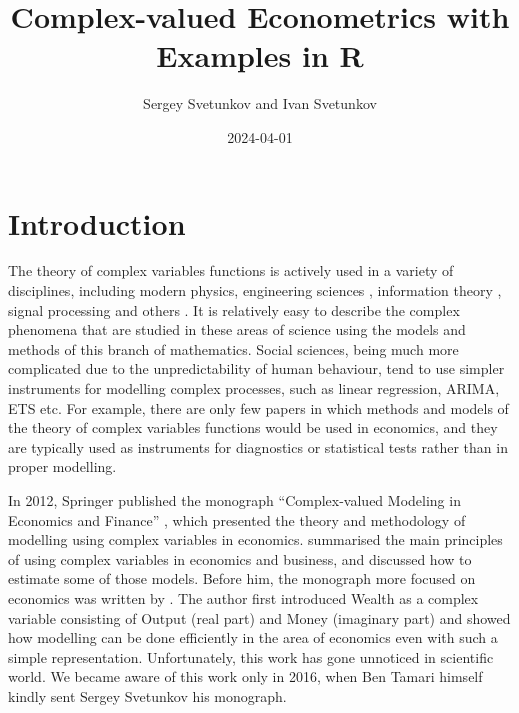 \documentclass[
]{book}
\title{Complex-valued Econometrics with Examples in R}
\author{Sergey Svetunkov and Ivan Svetunkov}
\date{2024-04-01}
\begin{document}
\maketitle

{
\setcounter{tocdepth}{2}
\tableofcontents
}
\hypertarget{introduction}{%
\chapter*{Introduction}\label{introduction}}

The theory of complex variables functions is actively used in a variety of disciplines, including modern physics, engineering sciences \citep{Mandic2007, Jia2016}, information theory \citep{Eriksson2006}, signal processing \citep{Arens1957, Brown1969, Gardner1993, Charge2001, Gerstacker2003, Delmas2004, Chevalier2006, Buzzi2006, Percival2006, Taubock2007, Rubin-Delanchy2007, Adali2008} and others \citep[e.g.][]{Kociuba2016}. It is relatively easy to describe the complex phenomena that are studied in these areas of science using the models and methods of this branch of mathematics. Social sciences, being much more complicated due to the unpredictability of human behaviour, tend to use simpler instruments for modelling complex processes, such as linear regression, ARIMA, ETS etc. For example, there are only few papers in which methods and models of the theory of complex variables functions would be used in economics, and they are typically used as instruments for diagnostics or statistical tests \citep[for example, for the unit root test, such as ADF from][]{Dickey1979} rather than in proper modelling.

In 2012, Springer published the monograph ``Complex-valued Modeling in Economics and Finance'' \citep{Svetunkov2012}, which presented the theory and methodology of modelling using complex variables in economics. \citet{Svetunkov2012} summarised the main principles of using complex variables in economics and business, and discussed how to estimate some of those models. Before him, the monograph more focused on economics was written by \citet{Tamari1997}. The author first introduced Wealth as a complex variable consisting of Output (real part) and Money (imaginary part) and showed how modelling can be done efficiently in the area of economics even with such a simple representation. Unfortunately, this work has gone unnoticed in scientific world. We became aware of this work only in 2016, when Ben Tamari himself kindly sent Sergey Svetunkov his monograph.
\end{document}
